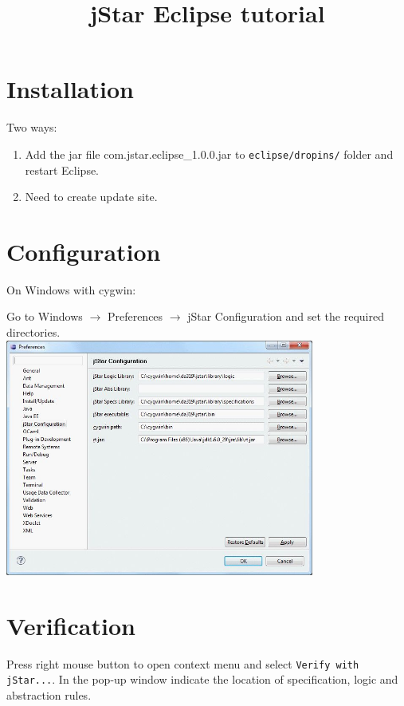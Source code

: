 \documentclass{article}
\begin{document}
\title{jStar Eclipse tutorial} 
\maketitle 


\section{Installation}

Two ways:
\begin{enumerate}
\item Add the jar file com.jstar.eclipse\_1.0.0.jar to \texttt{eclipse/dropins/} folder and restart Eclipse.
\item {\color{red} Need to create update site.}
\end{enumerate}

\section{Configuration}

On Windows with cygwin:

Go to Windows $\rightarrow$ Preferences $\rightarrow$ jStar Configuration and set the required directories.\\

\includegraphics[width=4in]{images/preferences.jpg}

\section{Verification}
Press right mouse button to open context menu and select \texttt{Verify with jStar...}.
In the pop-up window indicate the location of specification, logic and abstraction rules.\\
\end{document}
